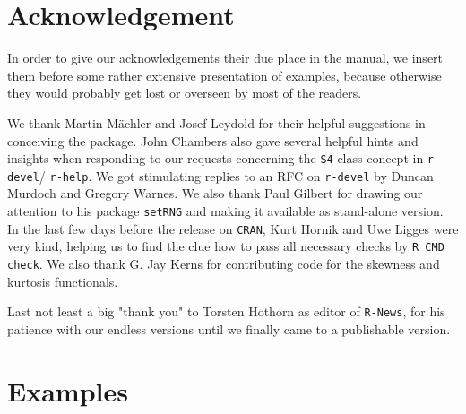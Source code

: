 \documentclass[11pt]{article}
\begin{document}
\section{Acknowledgement}
In order to give our acknowledgements their due place
in the manual, we insert them before some rather
extensive presentation of examples, because otherwise
they would probably get lost or overseen by most of the
readers.

We thank Martin M\"achler and Josef Leydold for their
helpful suggestions in conceiving the package.
John Chambers also gave several helpful hints and
insights when responding to our requests concerning the
{\tt S4}-class concept in {\tt r-devel}/ {\tt r-help}.
We got stimulating replies to an RFC on {\tt r-devel} by
Duncan Murdoch and Gregory Warnes.
We also thank Paul Gilbert for drawing our attention to his package
 {\tt setRNG} and making it available as stand-alone version.
In the last few days before the release on {\tt CRAN}, Kurt Hornik and
Uwe Ligges were very kind, helping us to find the clue how to
pass all necessary checks by {\tt R CMD check}.
We also thank G. Jay Kerns for contributing code for
the skewness and kurtosis functionals.

Last not least a big "thank you" to Torsten Hothorn as editor
of {\tt R-News}, for his patience with our endless versions
until we finally came to a publishable version.
%
%
\section{Examples}
\end{document}
